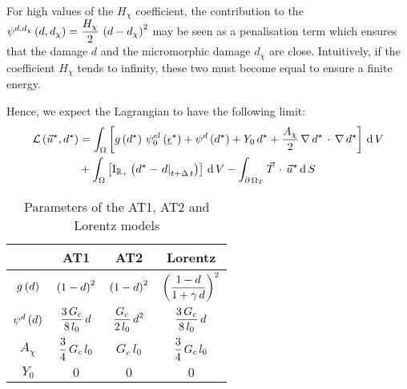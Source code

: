 For high values of the \(H_{\chi}\) coefficient, the contribution to the
\({\psi}^{d, d_{\chi}}\left(d,
d_{\chi}\right)=\displaystyle \frac{\displaystyle H_{\chi}}{\displaystyle 2}\,\left(d-d_{\chi}\right)^{2}\) may be seen as a
penalisation term which ensures that the damage \(d\) and the
micromorphic damage \(d_{\chi}\) are close. Intuitively, if the
coefficient \(H_{\chi}\) tends to infinity, these two must become
equal to ensure a finite energy.

Hence, we expect the Lagrangian to have the following limit:
%
%
%
\begin{equation}
  \label{eq:micromorphicdamage:LagrangianLimit}
  \begin{aligned}
  \mathcal{L}\left(\vec{u}^{\star},d^{\star}\right)
  &=\int_{\Omega}
  \left[
  g\left(d^{\star}\right)\,{\psi}^{el}_{0}\left(\underline{\epsilon}^{\star}\right)+
  {\psi}^{d}\left(d^{\star}\right)+
  Y_{0}\,d^{\star}
  +\displaystyle \frac{\displaystyle A_{\chi}}{\displaystyle 2}\,\nabla\, d^{\star}\,\cdot\,\nabla\, d^{\star}
  \right]
  \,\mathrm{d}\,V\\
  &+\int_{\Omega}
  \left[
  \mathrm{I}_{\mathbb{R}_{+}}\left(d^{\star}-\left.d\right|_{t+\Delta\,t}\right) 
  \right]
  \,\mathrm{d}\,V
  - \int_{\partial\,\Omega_{T}} \vec{T}\,\cdot\,\vec{u}^{\star} \,\mathrm{d}\,S
  \end{aligned}
\end{equation}

\begin{table}[H]
    \centering
    \begin{tabular}{||c c c c||} 
        \hline
         & AT1 & AT2 & Lorentz
        \\
        [0.5ex] 
        \hline\hline
        \(g\left(d\right)\)            & \(\left(1-d\right)^{2}\)              & \(\left(1-d\right)^{2}\)               & \(\left(\displaystyle \frac{\displaystyle 1-d}{\displaystyle 1+\gamma\,d}\right)^{2}\)  
        \\
        \({\psi}^{d}\left(d\right)\) & \(\displaystyle \frac{\displaystyle 3\,G_{c}}{\displaystyle 8\,l_{0}}\,d\) & \(\displaystyle \frac{\displaystyle G_{c}}{\displaystyle 2\,l_{0}}\,d^{2}\) & \(\displaystyle \frac{\displaystyle 3\,G_{c}}{\displaystyle 8\,l_{0}}\,d\)         
        \\
        \(A_{\chi}\)              & \(\displaystyle \frac{\displaystyle 3}{\displaystyle 4}\,G_{c}\,l_{0}\)    & \(G_{c}\,l_{0}\)                  & \(\displaystyle \frac{\displaystyle 3}{\displaystyle 4}\,G_{c}\,l_{0}\)    
        \\
        \(Y_{0}\)                 & \(0\)                            & \(0\)                             &  \(0\)   
        \\
        \hline
    \end{tabular}
    \caption{Parameters of the AT1, AT2 and Lorentz models}
    \label{tbl:micromorphicdamage:ATparameters}
\end{table}

